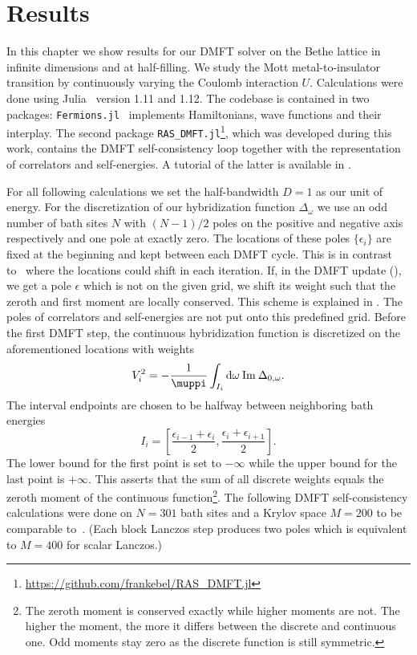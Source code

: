 
\chapter{Results}%
\label{ch:results}

In this chapter we show results for our DMFT solver
on the Bethe lattice in infinite dimensions and at half-filling.
We study the Mott metal-to-insulator transition
by continuously varying the Coulomb interaction $U$.
Calculations were done using Julia~\cite{Bezanson2017} version 1.11 and 1.12.
The codebase is contained in two packages:
\texttt{Fermions.jl}~\cite{Wallerberger2022} implements
Hamiltonians, wave functions and their interplay.
The second package \texttt{RAS\_DMFT.jl}\footnote{
    \url{https://github.com/frankebel/RAS_DMFT.jl}
},
which was developed during this work,
contains the DMFT self-consistency loop together
with the representation of correlators and self-energies.
A tutorial of the latter is available in .

For all following calculations we set the half-bandwidth $D=1$ as our unit of energy.
For the discretization of our hybridization function $\Delta_\omega$
we use an odd number of bath sites $N$
with $(N - 1)/2$ poles on the positive and negative axis respectively
and one pole at exactly zero.
The locations of these poles $\{\epsilon_i\}$ are fixed at the beginning
and kept between each DMFT cycle.
This is in contrast to~\cite{Lu2014, Lu2019} where the locations could shift in each iteration.
If, in the DMFT update (), we get a pole $\epsilon$ which is not on the given grid,
we shift its weight such that the zeroth and first moment are locally conserved.
This scheme is explained in .
The poles of correlators and self-energies are not put onto this predefined grid.
Before the first DMFT step,
the continuous hybridization function is discretized on the aforementioned locations
with weights
\begin{equation}
    V_i^2 = -\frac{1}{\muppi} \int_{I_i} \md\omega\> \Im \Delta_{0,\omega}.
\end{equation}
The interval endpoints are chosen to be halfway between neighboring bath energies
\begin{equation}
    I_i = \left[\frac{\epsilon_{i-1} + \epsilon_i}{2}, \frac{\epsilon_i + \epsilon_{i+1}}{2}\right].
\end{equation}
The lower bound for the first point is set to $-\infty$
while the upper bound for the last point is $+\infty$.
This asserts that
the sum of all discrete weights equals the zeroth moment of the continuous function\footnote{
    The zeroth moment is conserved exactly while higher moments are not.
    The higher the moment,
    the more it differs between the discrete and continuous one.
    Odd moments stay zero as the discrete function is still symmetric.
}.
The following DMFT self-consistency calculations were done on $N=301$ bath sites
and a Krylov space $M=200$ to be comparable to~\cite{Lu2019}.
(Each block Lanczos step produces two poles which is equivalent to $M=400$ for scalar Lanczos.)

